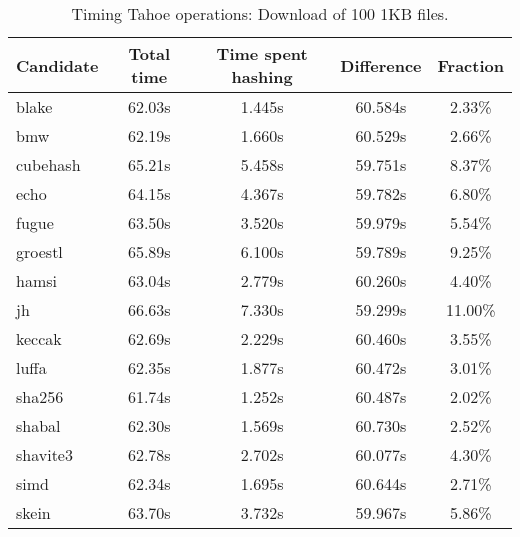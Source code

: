 \begin{table}[h]
  \centering
  \begin{tabular}{ | l | c | c | c | c | }
    \hline
    Candidate & Total time & Time spent hashing & Difference & Fraction \\ \hline
    blake & 62.03s & 1.445s & 60.584s & 2.33\% \\ \hline
    bmw & 62.19s & 1.660s & 60.529s & 2.66\% \\ \hline
    cubehash & 65.21s & 5.458s & 59.751s & 8.37\% \\ \hline
    echo & 64.15s & 4.367s & 59.782s & 6.80\% \\ \hline
    fugue & 63.50s & 3.520s & 59.979s & 5.54\% \\ \hline
    groestl & 65.89s & 6.100s & 59.789s & 9.25\% \\ \hline
    hamsi & 63.04s & 2.779s & 60.260s & 4.40\% \\ \hline
    jh & 66.63s & 7.330s & 59.299s & 11.00\% \\ \hline
    keccak & 62.69s & 2.229s & 60.460s & 3.55\% \\ \hline
    luffa & 62.35s & 1.877s & 60.472s & 3.01\% \\ \hline
    sha256 & 61.74s & 1.252s & 60.487s & 2.02\% \\ \hline
    shabal & 62.30s & 1.569s & 60.730s & 2.52\% \\ \hline
    shavite3 & 62.78s & 2.702s & 60.077s & 4.30\% \\ \hline
    simd & 62.34s & 1.695s & 60.644s & 2.71\% \\ \hline
    skein & 63.70s & 3.732s & 59.967s & 5.86\% \\ \hline
  \end{tabular}
  \caption{Timing Tahoe operations: Download of 100 1KB files.}
  \label{tbl:hashingtimes:get1kb}
\end{table}

